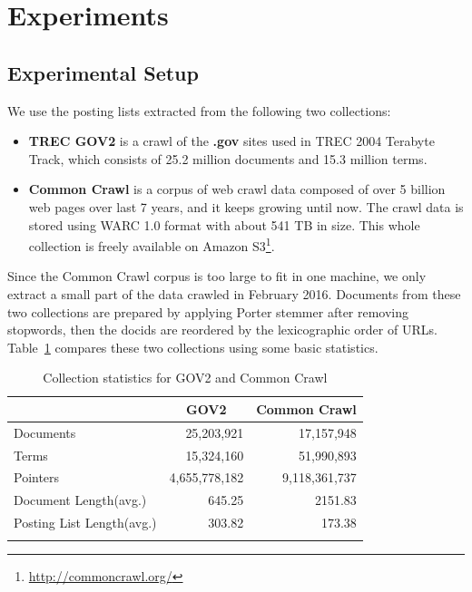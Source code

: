 \documentclass[runningheads,a4paper]{llncs}
\begin{document}
\section{Experiments}\label{sec:experiments}

\subsection{Experimental Setup}

We use the posting lists extracted from the following two collections:
\begin{itemize}
	\item \textbf{TREC GOV2} is a crawl of the \textbf{.gov} sites used in TREC 2004 Terabyte Track, which consists of 25.2 million documents and 15.3 million terms.
	\item \textbf{Common Crawl} is a corpus of web crawl data composed of over 5 billion web pages over last 7 years, and it keeps growing until now.
	The crawl data is stored using WARC 1.0 format with about 541 TB in size.
	This whole collection is freely available on Amazon S3\footnote{\url{http://commoncrawl.org/}}.
\end{itemize}

Since the Common Crawl corpus is too large to fit in one machine, we only extract a small part of the data crawled in February 2016.
Documents from these two collections are prepared by applying Porter stemmer after removing stopwords, then the docids are reordered by the lexicographic order of URLs.
Table~\ref{tab:collection statistics} compares these two collections using some basic statistics.

\begin{table}
	\centering
	\caption{Collection statistics for GOV2 and Common Crawl}
	\renewcommand{\arraystretch}{1.0}
	\begin{tabular}{l*{2}{r}}
		\toprule
		& \multicolumn{1}{c}{GOV2} & \multicolumn{1}{c}{Common Crawl} \\
		\midrule
		Documents & 25,203,921 & 17,157,948 \\
		Terms & 15,324,160 & 51,990,893 \\
		Pointers & 4,655,778,182 & 9,118,361,737 \\
		Document Length(avg.) & 645.25 & 2151.83 \\
		Posting List Length(avg.) & 303.82 & 173.38 \\
		\bottomrule
		\label{tab:collection statistics}
	\end{tabular}
\end{table}
\end{document}
